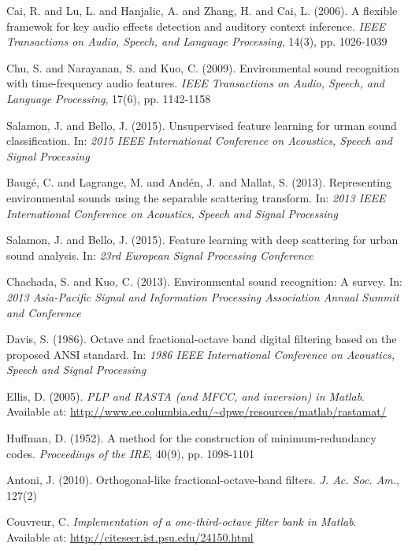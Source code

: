 \documentclass[final,3p,times,twocolumn]{elsarticle}
\begin{document}
\begin{thebibliography}{09}
Cai, R. and Lu, L. and Hanjalic, A. and Zhang, H. and Cai, L. (2006). A flexible framewok for key audio effects detection and auditory context inference. \textit{IEEE Transactions on Audio, Speech, and Language Processing}, 14(3), pp. 1026-1039

Chu, S. and Narayanan, S. and Kuo, C. (2009). Environmental sound recognition with time-frequency audio features. \textit{IEEE Transactions on Audio, Speech, and Language Processing}, 17(6), pp. 1142-1158

Salamon, J. and Bello, J. (2015). Unsupervised feature learning for urman sound classification. In: \textit{2015 IEEE International Conference on Acoustics, Speech and Signal Processing}

Baugé, C. and Lagrange, M. and Andén, J. and Mallat, S. (2013). Representing environmental sounds using the separable scattering transform. In: \textit{2013 IEEE International Conference on Acoustics, Speech and Signal Processing}

Salamon, J. and Bello, J. (2015). Feature learning with deep scattering for urban sound analysis. In: \textit{23rd European Signal Processing Conference}

Chachada, S. and Kuo, C. (2013). Environmental sound recognition: A survey. In: \textit{2013 Asia-Pacific Signal and Information Processing Association Annual Summit and Conference}

Davis, S. (1986). Octave and fractional-octave band digital filtering based on the proposed ANSI standard. In: \textit{1986 IEEE International Conference on Acoustics, Speech and Signal Processing}

Ellis, D. (2005). \textit{{PLP} and {RASTA} (and {MFCC}, and inversion) in {M}atlab}. Available at: \url{http://www.ee.columbia.edu/~dpwe/resources/matlab/rastamat/}

Huffman, D. (1952). A method for the construction of minimum-redundancy codes. \textit{Proceedings of the IRE}, 40(9), pp. 1098-1101

Antoni, J. (2010). Orthogonal-like fractional-octave-band filters. \textit{J. Ac. Soc. Am.}, 127(2)

Couvreur, C. \textit{Implementation of a one-third-octave filter bank in Matlab}. Available at: \url{http://citeseer.ist.psu.edu/24150.html}


\end{thebibliography}
\end{document}

